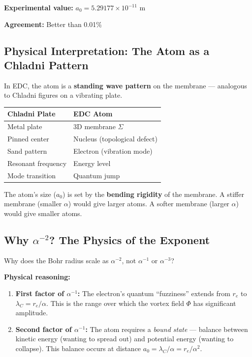 \textbf{Experimental value:} $a_0 = 5.29177 \times 10^{-11}$ m

\textbf{Agreement:} Better than 0.01\%

\subsection{Physical Interpretation: The Atom as a Chladni Pattern}
\label{subsec:chladni}

\begin{tcolorbox}[colback=yellow!5,colframe=orange!70,title=\textbf{The Atom is Not a Miniature Solar System}]
In EDC, the atom is a \textbf{standing wave pattern} on the membrane --- analogous to Chladni figures on a vibrating plate.

\begin{center}
\begin{tabular}{|l|l|}
\hline
\textbf{Chladni Plate} & \textbf{EDC Atom} \\
\hline
Metal plate & 3D membrane $\Sigma$ \\
Pinned center & Nucleus (topological defect) \\
Sand pattern & Electron (vibration mode) \\
Resonant frequency & Energy level \\
Mode transition & Quantum jump \\
\hline
\end{tabular}
\end{center}

The atom's size ($a_0$) is set by the \textbf{bending rigidity} of the membrane. A stiffer membrane (smaller $\alpha$) would give larger atoms. A softer membrane (larger $\alpha$) would give smaller atoms.
\end{tcolorbox}

\subsection{Why $\alpha^{-2}$? The Physics of the Exponent}
\label{subsec:why_alpha_squared}

Why does the Bohr radius scale as $\alpha^{-2}$, not $\alpha^{-1}$ or $\alpha^{-3}$?

\textbf{Physical reasoning:}

\begin{enumerate}
    \item \textbf{First factor of $\alpha^{-1}$:} The electron's quantum ``fuzziness'' extends from $r_e$ to $\lambda_C = r_e/\alpha$. This is the range over which the vortex field $\Phi$ has significant amplitude.
    
    \item \textbf{Second factor of $\alpha^{-1}$:} The atom requires a \textit{bound state} --- balance between kinetic energy (wanting to spread out) and potential energy (wanting to collapse). This balance occurs at distance $a_0 = \lambda_C/\alpha = r_e/\alpha^2$.
\end{enumerate}

